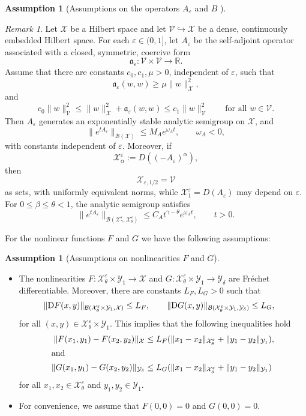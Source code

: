 \documentclass[11pt]{article}
\theoremstyle{definition}
\newtheorem{assumption}[theorem]{Assumption}
\theoremstyle{remark}
\newtheorem{remark}[theorem]{Remark}
\numberwithin{equation}{section}
\newcommand{\eps}{\varepsilon}
\newcommand{\mc}[1]{\mathcal{#1}}
\begin{document}
\begin{assumption}[Assumptions on the operators $A_\eps$ and $B$ ]
\begin{remark}
    Let \(\mc X\) be a Hilbert space and let \(\mc V\hookrightarrow \mc X\) be a dense, continuously embedded Hilbert space.
    For each \(\varepsilon\in(0,1]\), let \(A_\varepsilon\) be the self-adjoint operator associated with a closed, symmetric, coercive form 
    \[ \mathfrak a_\varepsilon:\mc V\times \mc V\to\mathbb R .\]
    Assume that there are constants \(c_0,c_1,\mu>0\), independent of \(\varepsilon\), such that
    \[ \mathfrak a_\varepsilon(w,w)\ge \mu\|w\|_{\mc X}^2,\]
    and
    \[ c_0\|w\|_{\mc V}^2 \le \|w\|_{\mc X}^2+\mathfrak a_\varepsilon(w,w) \le c_1\|w\|_{\mc V}^2 \qquad\text{for all }w\in \mc V. \]
    Then \(A_\varepsilon\) generates an exponentially stable analytic semigroup on \(\mc X\), and
    \[\|e^{tA_\varepsilon}\|_{\mathcal B(\mc X)}\le M_Ae^{\omega_A t},\qquad \omega_A<0, \]
    with constants independent of \(\varepsilon\).
    Moreover, if
    \[\mc X_{\alpha}^\eps:=D((-A_\varepsilon)^\alpha),\]
    then
    \[\mc X_{\varepsilon,1/2}=\mc V\]
    as sets, with uniformly equivalent norms, while \(\mc X_{1}^\eps=D(A_\varepsilon)\) may depend on \(\varepsilon\).
    For \(0\le \beta\le \theta<1\), the analytic semigroup satisfies
    \[ \|e^{tA_\varepsilon}\|_{\mathcal B(\mc X_{\gamma}^\eps, \mc X_{\theta}^\eps)} \le C_A t^{\gamma-\theta}e^{\omega_A t}, \qquad t>0. \]
\end{remark}


\end{assumption}
For the nonlinear functions $F$ and $G$ we have the following assumptions:
\begin{assumption}[Assumptions on nonlinearities $F$ and $G$]\label{ass: nonlinearities}
\leavevmode
\begin{itemize}
    \item The nonlinearities $F:\mc X_\theta^\eps\times \mc Y_{1}\to \mc X$ and $G:\mc X_{\theta}^\eps\times \mc Y_{1}\to\mc  Y_\delta$ are Fr\'echet differentiable. Moreover, there are constants $L_F, L_G>0$ such that
    \begin{align} \label{eq: lip est non lin}
       \|\textnormal{D} F(x,y)\|_{\mathcal{B}(\mc X_\theta^\eps\times \mc Y_{1},\mc X)}&\leq L_F,\qquad  \|\textnormal{D} G(x,y)\|_{\mathcal{B}(\mc X_\theta^\eps\times \mc Y_{1},\mc Y_\delta)}\leq L_G, 
    \end{align}
    for all $(x,y)\in  \mc X_\theta^\eps\times \mc Y_{1}$.
    This implies that the following inequalities hold
        \begin{align}\label{eq: Lip F}
        \|F(x_1,y_1)-F(x_2,y_2)\|_{\mc X}&\leq L_F( \|x_1-x_2\|_{\mc X_\theta^\eps}+\|y_1-y_2\|_{\mc Y_{1}}),\\
        \intertext{and}
        \label{eq: Lip G}
        \|G(x_1,y_1)-G(x_2,y_2)\|_{\mc Y_\delta}&\leq L_G( \|x_1-x_2\|_{\mc X_\theta^\eps}+\|y_1-y_2\|_{\mc Y_{1}})
    \end{align}
    for all $x_1,x_2\in \mc X_\theta^\eps$ and $y_1,y_2\in\mc Y_{1}$.  
    \item For convenience, we assume that $F(0,0)=0$ and $G(0,0)=0$.
\end{itemize}
\end{assumption}
\end{document}
